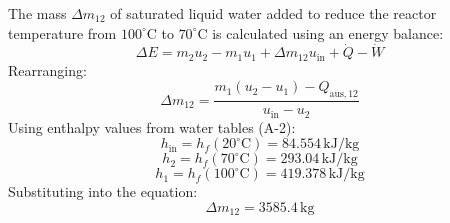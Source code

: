 The mass \( \Delta m_{12} \) of saturated liquid water added to reduce the reactor temperature from \( 100^\circ\text{C} \) to \( 70^\circ\text{C} \) is calculated using an energy balance:  
\[
\Delta E = m_2 u_2 - m_1 u_1 + \Delta m_{12} u_{\text{in}} + \dot{Q} - \dot{W}
\]  
Rearranging:  
\[
\Delta m_{12} = \frac{m_1 (u_2 - u_1) - Q_{\text{aus},12}}{u_{\text{in}} - u_2}
\]  
Using enthalpy values from water tables (A-2):  
\[
h_{\text{in}} = h_f(20^\circ\text{C}) = 84.554 \, \text{kJ/kg}
\]  
\[
h_2 = h_f(70^\circ\text{C}) = 293.04 \, \text{kJ/kg}
\]  
\[
h_1 = h_f(100^\circ\text{C}) = 419.378 \, \text{kJ/kg}
\]  
Substituting into the equation:  
\[
\Delta m_{12} = 3585.4 \, \text{kg}
\]